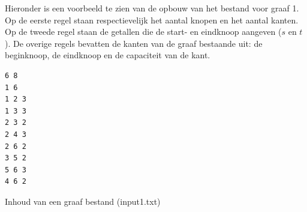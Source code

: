 Hieronder is een voorbeeld te zien van de opbouw van het bestand voor graaf 1. Op de eerste regel staan respectievelijk het aantal knopen en het aantal kanten.
Op de tweede regel staan de getallen die de start- en eindknoop aangeven ($s$ en $t$).
De overige regels bevatten de kanten van de graaf bestaande uit: de beginknoop, de eindknoop en de capaciteit van de kant.
\begin{table}[h]
\begin{lstlisting}
6 8
1 6
1 2 3
1 3 3
2 3 2
2 4 3
2 6 2
3 5 2
5 6 3
4 6 2
\end{lstlisting}
\caption{Inhoud van een graaf bestand (input1.txt)}
\end{table} 